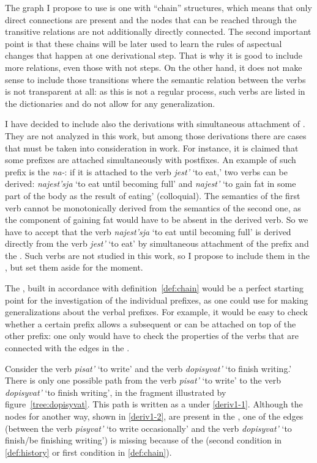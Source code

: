 The graph I propose to use is one with ``chain'' structures, which means that only direct connections are present and the nodes that can be reached through the transitive relations are not additionally directly connected. The second important point is that these chains will be later used to learn the rules of aspectual changes that happen at one derivational step. That is why it is good to include more relations, even those with not  steps. On the other hand, it does not make sense to include those transitions where the semantic relation between the verbs is not transparent at all: as this is not a regular process, such verbs are listed in the dictionaries and do not allow for any generalization. 

I have decided to include also the derivations with simultaneous attachment of . They are not analyzed in this work, but among those derivations there are cases that must be taken into consideration in  work. For instance, it is claimed that some prefixes are attached simultaneously with postfixes. An example of such prefix is the  \textit{na-}: if it is attached to the verb \textit{jest'} `to eat,' two verbs can be derived: \textit{najest'sja} `to eat until becoming full' and \textit{najest'} `to gain fat in some part of the body as the result of eating' (colloquial). The semantics of the first verb cannot be  monotonically derived from the semantics of the second one, as the component of gaining fat would have to be absent in the derived verb. So we have to accept that the verb \textit{najest'sja} `to eat until becoming full' is derived directly from the verb \textit{jest'} `to eat' by simultaneous attachment of the prefix and the . Such verbs are not studied in this work, so I propose to include them in the , but set them aside for the moment.
 
The , built in accordance with definition~\ref{def:chain} would be a perfect starting point for the investigation of the individual prefixes, as one could use  for making generalizations about the verbal prefixes. For example, it would be easy to check whether a certain prefix allows a subsequent  or can be attached on top of the other prefix: one only would have to check the properties of the verbs that are connected with the edges in the . 

Consider the verb {\it pisat'} `to write' and the verb {\it dopisyvat'} `to finish writing.' There is only one possible path from the verb {\it pisat'} `to write' to the verb {\it dopisyvat'} `to finish writing', in the  fragment illustrated by figure~\ref{tree:dopisyvat}. This path is written as a  under \ref{deriv1-1}. Although the nodes for another way, shown in \ref{deriv1-2}, are present in the , one of the edges (between the verb \textit{pisyvat'} `to write occasionally' and the verb \textit{dopisyvat'} `to finish/be finishing writing') is missing because of the  (second condition in \ref{def:history} or first condition in \ref{def:chain}).

